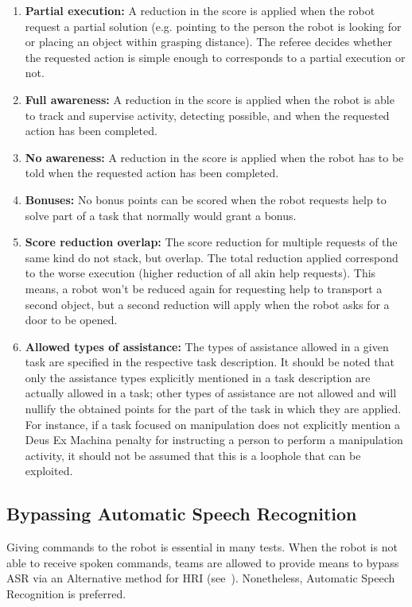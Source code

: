 \begin{enumerate}
	\item \textbf{Partial execution:} A reduction in the score is applied when the robot request a partial solution (e.g. pointing to the person the robot is looking for or placing an object within grasping distance).
	The referee decides whether the requested action is simple enough to corresponds to a partial execution or not.

	\item \textbf{Full awareness:} A reduction in the score is applied when the robot is able to track and supervise activity, detecting possible, and when the requested action has been completed.

	\item \textbf{No awareness:} A reduction in the score is applied when the robot has to be told when the requested action has been completed.

	\item \textbf{Bonuses:} No bonus points can be scored when the robot requests help to solve part of a task that normally would grant a bonus.

	\item \textbf{Score reduction overlap:} The score reduction for multiple requests of the same kind do not stack, but overlap.
	The total reduction applied correspond to the worse execution (higher reduction of all akin help requests).
	This means, a robot won't be reduced again for requesting help to transport a second object, but a second reduction will apply when the robot asks for a door to be opened.

	\item \textbf{Allowed types of assistance:} The types of assistance allowed in a given task are specified in the respective task description.
	It should be noted that only the assistance types explicitly mentioned in a task description are actually allowed in a task; other types of assistance are not allowed and will nullify the obtained points for the part of the task in which they are applied.
	For instance, if a task focused on manipulation does not explicitly mention a Deus Ex Machina penalty for instructing a person to perform a manipulation activity, it should not be assumed that this is a loophole that can be exploited.
\end{enumerate}

\subsection{Bypassing Automatic Speech Recognition}
\label{rule:asrcontinue}
Giving commands to the robot is essential in many tests.
When the robot is not able to receive spoken commands, teams are allowed to provide means to bypass ASR via an Alternative method for HRI (see~).
Nonetheless, Automatic Speech Recognition is preferred.

